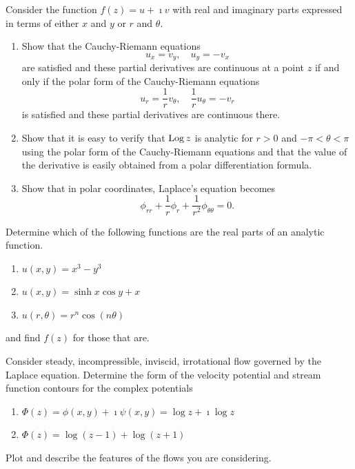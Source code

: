 {\begin{Exercise}
  \label{exercise cartesian cr polar cr}
  Consider the function $f(z) = u + \imath v$ with real and imaginary parts
  expressed in terms of either $x$ and $y$ or $r$ and $\theta$.
  \begin{enumerate}
  \item 
    Show that the Cauchy-Riemann equations
    \[
    u_x = v_y, \quad u_y = - v_x
    \]
    are satisfied and these partial derivatives are continuous at a point $z$ 
    if and only if the polar form of the Cauchy-Riemann equations
    \[
    u_r = \frac{1}{r} v_\theta, \quad \frac{1}{r} u_\theta = - v_r
    \]
    is satisfied and these partial derivatives are continuous there.
  \item 
    Show that it is easy to verify that $\mathop{\mathrm{Log}}\nolimits z$ is analytic for $r > 0$
    and $- \pi < \theta < \pi$
    using the polar form of the Cauchy-Riemann equations and that the value
    of the derivative is easily obtained from a polar differentiation formula.
  \item 
    Show that in polar coordinates, Laplace's equation becomes
    \[
    \phi_{r r} + \frac{1}{r} \phi_r + \frac{1}{r^2} \phi_{\theta \theta} = 0.
    \]
  \end{enumerate}

\end{Exercise}







\begin{Exercise}
  \label{exercise real part x3 y3}
  Determine which of the following functions are the real parts of an analytic
  function.
  \begin{enumerate}
  \item 
    $u(x,y) = x^3 - y^3$
  \item 
    $u(x,y) = \sinh x \cos y + x$
  \item
    $u(r,\theta) = r^n \cos(n \theta)$
  \end{enumerate}
  and find $f(z)$ for those that are.

\end{Exercise}





\begin{Exercise}
  \label{exercise potential flow log z-1 log z+1}
  Consider steady, incompressible, inviscid, irrotational flow governed by the
  Laplace equation.  Determine the form of the velocity potential and stream
  function contours for the complex potentials
  \begin{enumerate}
  \item $\Phi(z) = \phi(x,y) + \imath \psi(x,y) = \log z + \imath \log z$
  \item $\Phi(z) = \log(z - 1) + \log(z + 1)$
  \end{enumerate}
  Plot and describe the features of the flows you are considering.


\end{Exercise}}
